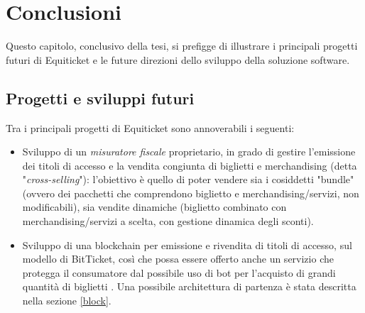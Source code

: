 \chapter{Conclusioni}
\label{chap:conc}
Questo capitolo, conclusivo della tesi, si prefigge di illustrare i principali progetti futuri di Equiticket e le future direzioni dello sviluppo della soluzione software.
\section{Progetti e sviluppi futuri} \label{sec:prog}
Tra i principali progetti di Equiticket sono annoverabili i seguenti: 
\begin{itemize}
\item Sviluppo di un \emph{misuratore fiscale} proprietario, in grado di gestire l'emissione dei titoli di accesso e la vendita congiunta di biglietti e merchandising (detta "\emph{cross-selling}"): l'obiettivo è quello di poter vendere sia i cosiddetti "bundle" (ovvero dei pacchetti che comprendono biglietto e merchandising/servizi, non modificabili), sia vendite dinamiche (biglietto combinato con merchandising/servizi a scelta, con gestione dinamica degli sconti). 
\item Sviluppo di una blockchain per emissione e rivendita di titoli di accesso, sul modello di BitTicket, così che possa essere offerto anche un servizio che protegga il consumatore dal possibile uso di bot per l'acquisto di grandi quantità di biglietti \cite{tackmann2017secure}. Una possibile architettura di partenza è stata descritta nella sezione \ref{block}.
\end{itemize}